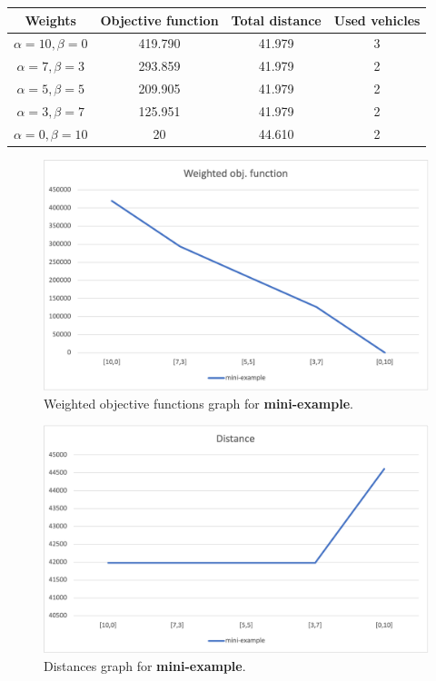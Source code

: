 {
\renewcommand{\arraystretch}{2}
\begin{longtable}[h]{| c | c | c | c |}
    \hline
    \textbf{Weights} & \textbf{Objective function} & \textbf{Total distance} & \textbf{Used vehicles} \\
    \hline
    \endhead
    $\alpha = 10, \beta = 0$ & 419.790 & 41.979 & 3 \\
    \hline
    $\alpha = 7, \beta = 3$  & 293.859 & 41.979 & 2 \\
    \hline
    $\alpha = 5, \beta = 5$  & 209.905 & 41.979 & 2 \\
    \hline
    $\alpha = 3, \beta = 7$  & 125.951 & 41.979 & 2 \\
    \hline
    $\alpha = 0, \beta = 10$ &      20 & 44.610 & 2 \\
    \hline
\end{longtable}
}
\begin{figure}[H]
    \centering
    \includegraphics[height=0.25\textheight]{../graphs/mini-example-wobjf.png}
    \caption{Weighted objective functions graph for \textbf{mini-example}.}
\end{figure}

\begin{figure}[H]
    \centering
    \includegraphics[height=0.25\textheight]{../graphs/mini-example-distance.png}
    \caption{Distances graph for \textbf{mini-example}.}
\end{figure}

